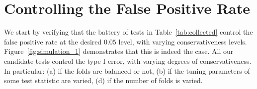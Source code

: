 \documentclass[12pt,a4paper]{article}
\begin{document}
\section{Controlling the False Positive Rate}
\label{sec:type_i}

We start by verifying that the battery of tests in Table~\ref{tab:collected} control the false positive rate at the desired $0.05$ level, with varying conservativeness levels. 
Figure~\ref{fig:simulation_1} demonstrates that this is indeed the case. 
All our candidate tests control the type I error, with varying degrees of conservativeness. 
In particular:
(a) if the folds are balanced or not,
(b) if the tuning parameters of some test statistic are varied,
(d) if the number of folds is varied.
\end{document}
